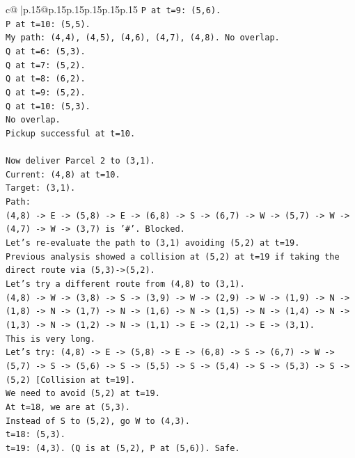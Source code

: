 \documentclass{article}
\begin{document}
{\begin{supertabular}{c@{$\;$}|p{.15\linewidth}@{}p{.15\linewidth}p{.15\linewidth}p{.15\linewidth}p{.15\linewidth}p{.15\linewidth}}
{{{\texttt{P at t=9: (5,6).} \\
\texttt{P at t=10: (5,5).} \\
\texttt{My path: (4,4), (4,5), (4,6), (4,7), (4,8). No overlap.} \\
\texttt{Q at t=6: (5,3).} \\
\texttt{Q at t=7: (5,2).} \\
\texttt{Q at t=8: (6,2).} \\
\texttt{Q at t=9: (5,2).} \\
\texttt{Q at t=10: (5,3).} \\
\texttt{No overlap.} \\
\texttt{Pickup successful at t=10.} \\
\\ 
\texttt{Now deliver Parcel 2 to (3,1).} \\
\texttt{Current: (4,8) at t=10.} \\
\texttt{Target: (3,1).} \\
\texttt{Path:} \\
\texttt{(4,8) {-}> E {-}> (5,8) {-}> E {-}> (6,8) {-}> S {-}> (6,7) {-}> W {-}> (5,7) {-}> W {-}> (4,7) {-}> W {-}> (3,7) is '\#'. Blocked.} \\
\texttt{Let's re{-}evaluate the path to (3,1) avoiding (5,2) at t=19.} \\
\texttt{Previous analysis showed a collision at (5,2) at t=19 if taking the direct route via (5,3){-}>(5,2).} \\
\texttt{Let's try a different route from (4,8) to (3,1).} \\
\texttt{(4,8) {-}> W {-}> (3,8) {-}> S {-}> (3,9) {-}> W {-}> (2,9) {-}> W {-}> (1,9) {-}> N {-}> (1,8) {-}> N {-}> (1,7) {-}> N {-}> (1,6) {-}> N {-}> (1,5) {-}> N {-}> (1,4) {-}> N {-}> (1,3) {-}> N {-}> (1,2) {-}> N {-}> (1,1) {-}> E {-}> (2,1) {-}> E {-}> (3,1).} \\
\texttt{This is very long.} \\
\texttt{Let's try: (4,8) {-}> E {-}> (5,8) {-}> E {-}> (6,8) {-}> S {-}> (6,7) {-}> W {-}> (5,7) {-}> S {-}> (5,6) {-}> S {-}> (5,5) {-}> S {-}> (5,4) {-}> S {-}> (5,3) {-}> S {-}> (5,2) {[}Collision at t=19{]}.} \\
\texttt{We need to avoid (5,2) at t=19.} \\
\texttt{At t=18, we are at (5,3).} \\
\texttt{Instead of S to (5,2), go W to (4,3).} \\
\texttt{t=18: (5,3).} \\
\texttt{t=19: (4,3). (Q is at (5,2), P at (5,6)). Safe.} \\
}}}
\end{supertabular}}
\end{document}
